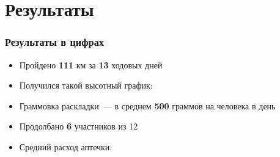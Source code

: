 \section{Результаты}
\begin{frame}
	
	\frametitle[	содержимое...]{Результаты в цифрах}
	\begin{itemize}
		\item<+-> Пройдено \textbf{111} км за \textbf{13} ходовых дней
		\item<+-> Получился такой высотный график:
		\item<+-> Граммовка раскладки~--- в среднем \textbf{500} граммов на человека в день
		\item<+-> Продолбано \textbf{6} участников из 12
		\item<+->Средний расход аптечки:
	\end{itemize}
	
\end{frame}

